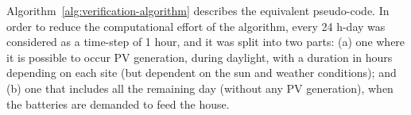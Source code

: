 %
%
%
% 
%
%
%

Algorithm~\ref{alg:verification-algorithm} describes the equivalent pseudo-code. %
In order to reduce the computational effort of the algorithm,
every 24 h-day was considered as a time-step of 1 hour, and it was split into two parts: (a) one where it is possible to occur PV generation, during daylight, with a duration in hours depending on each site (but dependent on the sun and weather conditions); and (b) one that includes all the remaining day (without any PV generation), when the batteries are demanded to feed the house.

